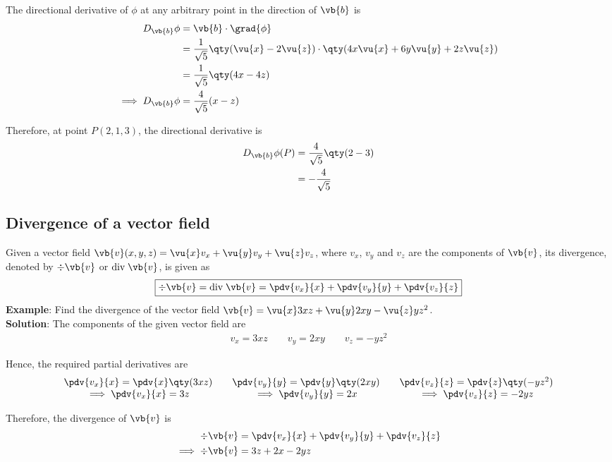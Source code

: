 			The directional derivative of $\phi$ at any arbitrary point in the direction of $\vb{b}$ is
			\begin{align*}
				D_{\vb{b}}\phi&=\vb{b}\cdot\grad{\phi} \\
				&=\dfrac{1}{\sqrt{5}}\qty(\vu{x}-2\vu{z})\cdot\qty(4x\vu{x}+6y\vu{y}+2z\vu{z}) \\
				&=\dfrac{1}{\sqrt{5}}\qty(4x-4z) \\
				\implies D_{\vb{b}}\phi&=\dfrac{4}{\sqrt{5}}(x-z)
			\end{align*}
			
			Therefore, at point $P(2,1,3)$, the directional derivative is
			\begin{align*}
				D_{\vb{b}}\phi(P)&=\dfrac{4}{\sqrt{5}}\qty(2-3) \\
				&=-\dfrac{4}{\sqrt{5}}
			\end{align*}
			
	\subsection{Divergence of a vector field}
		Given a vector field $\vb{v}(x,y,z)=\vu{x}v_x+\vu{y}v_y+\vu{z}v_z$, where $v_x$, $v_y$ and $v_z$ are the components of $\vb{v}$, its divergence, denoted by $\div{\vb{v}}$ or $\text{div}\;\vb{v}$, is given as
		\begin{align*}
			\boxed{\div{\vb{v}}=\text{div}\;\vb{v}=\pdv{v_x}{x}+\pdv{v_y}{y}+\pdv{v_z}{z}}
		\end{align*}
		\textbf{Example}: Find the divergence of the vector field $\vb{v}=\vu{x}3xz+\vu{y}2xy-\vu{z}yz^2$.\\
		\textbf{Solution}: The components of the given vector field are
		\begin{align*}
			v_x=3xz\qquad v_y=2xy\qquad v_z=-yz^2
		\end{align*}
		
		Hence, the required partial derivatives are
		\begin{align*}
			\begin{matrix}
				{\pdv{v_x}{x}=\pdv{x}\qty(3xz)} & {} & {\pdv{v_y}{y}=\pdv{y}\qty(2xy)} & {} & {\pdv{v_z}{z}=\pdv{z}\qty(-yz^2)} \\
				{\implies\pdv{v_x}{x}=3z} & {} & {\implies\pdv{v_y}{y}=2x} & {} & {\implies\pdv{v_z}{z}=-2yz}
			\end{matrix}
		\end{align*}
		
		Therefore, the divergence of $\vb{v}$ is
		\begin{align*}
			\div{\vb{v}}&=\pdv{v_x}{x}+\pdv{v_y}{y}+\pdv{v_z}{z} \\
			\implies\div{\vb{v}}&=3z+2x-2yz
		\end{align*}
		
